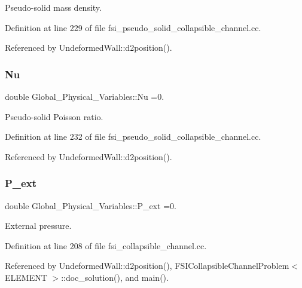 Pseudo-\/solid mass density. 



Definition at line 229 of file fsi\+\_\+pseudo\+\_\+solid\+\_\+collapsible\+\_\+channel.\+cc.



Referenced by Undeformed\+Wall\+::d2position().

\mbox{\label{namespaceGlobal__Physical__Variables_a3962c36313826b19f216f6bbbdd6a477}} 
\subsubsection{\texorpdfstring{Nu}{Nu}}
{\footnotesize\ttfamily double Global\+\_\+\+Physical\+\_\+\+Variables\+::\+Nu =0.}



Pseudo-\/solid Poisson ratio. 



Definition at line 232 of file fsi\+\_\+pseudo\+\_\+solid\+\_\+collapsible\+\_\+channel.\+cc.



Referenced by Undeformed\+Wall\+::d2position().

\mbox{\label{namespaceGlobal__Physical__Variables_a0406c0cbd463d1df2458fe5de98a00eb}} 
\subsubsection{\texorpdfstring{P\+\_\+ext}{P\_ext}}
{\footnotesize\ttfamily double Global\+\_\+\+Physical\+\_\+\+Variables\+::\+P\+\_\+ext =0.}



External pressure. 



Definition at line 208 of file fsi\+\_\+collapsible\+\_\+channel.\+cc.



Referenced by Undeformed\+Wall\+::d2position(), F\+S\+I\+Collapsible\+Channel\+Problem$<$ E\+L\+E\+M\+E\+N\+T $>$\+::doc\+\_\+solution(), and main().

